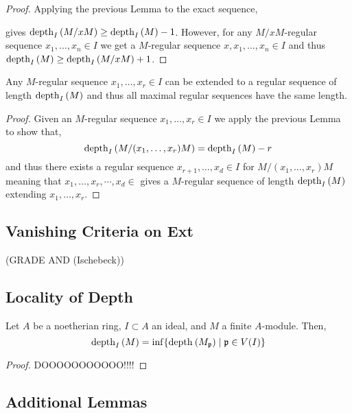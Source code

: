 \documentclass[12pt]{article}
\begin{document}
\begin{proof}
Applying the previous Lemma to the exact sequence,
\begin{center}
\end{center}
gives $\mathrm{depth}_{I} \left( M/xM \right) \ge \mathrm{depth}_{I} \left( M \right) - 1$. However, for any $M/xM$-regular sequence $x_1, \dots, x_n \in I$ we get a $M$-regular sequence $x, x_1, \dots, x_n \in I$ and thus $\mathrm{depth}_{I} \left( M \right) \ge \mathrm{depth}_{I} \left( M/xM \right) + 1$.
\end{proof}

\begin{cor}
Any $M$-regular sequence $x_1, \dots, x_r \in I$ can be extended to a regular sequence of length $\mathrm{depth}_{I} \left( M \right)$ and thus all maximal regular sequences have the same length.
\end{cor}

\begin{proof}
Given an $M$-regular sequence $x_1, \dots, x_r \in I$ we apply the previous Lemma to show that,
\[ \mathrm{depth}_{I} \left( M/(x_1, \dots, x_r)M \right) = \mathrm{depth}_{I} \left( M \right) - r \]
and thus there exists a regular sequence $x_{r+1}, \dots, x_d \in I$ for $M/(x_1, \dots, x_r)M$ meaning that $x_1, \dots, x_r, \cdots, x_d \in $ gives a $M$-regular sequence of length $\mathrm{depth}_{I} \left( M \right)$ extending $x_1, \dots, x_r$.
\end{proof}

\subsection{Vanishing Criteria on Ext}

(GRADE AND (Ischebeck))

\subsection{Locality of Depth}

\begin{prop}
Let $A$ be a noetherian ring, $I \subset A$ an ideal, and $M$ a finite $A$-module. Then,
\[ \mathrm{depth}_{I} \left( M \right) = \inf \{ \mathrm{depth}_{} \left( M_{\mathfrak{p}} \right) \mid \mathfrak{p} \in V(I) \} \]
\end{prop}

\begin{proof}
DOOOOOOOOOOO!!!!
\end{proof}

\subsection{Additional Lemmas}
\end{document}
